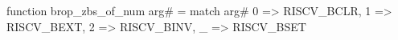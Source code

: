 function brop_zbs_of_num arg# = match arg# {
  0 => RISCV_BCLR,
  1 => RISCV_BEXT,
  2 => RISCV_BINV,
  _ => RISCV_BSET
}
